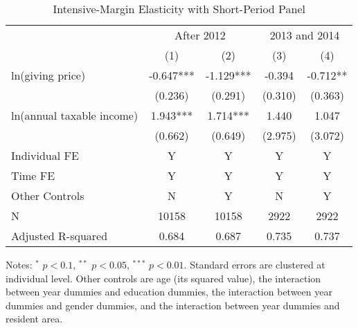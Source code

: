 \documentclass[
  11pt,
  a4paper,
]{article}
\begin{document}
\begin{table}

\caption{\label{tab:ShortIntensive}Intensive-Margin Elasticity with Short-Period Panel}
\centering
\fontsize{7}{9}\selectfont
\begin{threeparttable}
\begin{tabular}[t]{lcccc}
\toprule
\multicolumn{1}{c}{ } & \multicolumn{2}{c}{After 2012} & \multicolumn{2}{c}{2013 and 2014} \\
\cmidrule(l{3pt}r{3pt}){2-3} \cmidrule(l{3pt}r{3pt}){4-5}
 & (1) & (2) & (3) & (4)\\
\midrule
ln(giving price) & -0.647*** & -1.129*** & -0.394 & -0.712**\\
 & (0.236) & (0.291) & (0.310) & (0.363)\\
ln(annual taxable income) & 1.943*** & 1.714*** & 1.440 & 1.047\\
 & (0.662) & (0.649) & (2.975) & (3.072)\\
Individual FE & Y & Y & Y & Y\\
Time FE & Y & Y & Y & Y\\
Other Controls & N & Y & N & Y\\
N & 10158 & 10158 & 2922 & 2922\\
Adjusted R-squared & 0.684 & 0.687 & 0.735 & 0.737\\
\bottomrule
\end{tabular}
\begin{tablenotes}
\item Notes: $^{*}$ $p < 0.1$, $^{**}$ $p < 0.05$, $^{***}$ $p < 0.01$. Standard errors are clustered at individual level. Other controls are age (its squared value), the interaction between year dummies and education dummies, the interaction between year dummies and gender dummies, and the interaction between year dummies and resident area.
\end{tablenotes}
\end{threeparttable}
\end{table}
\end{document}
